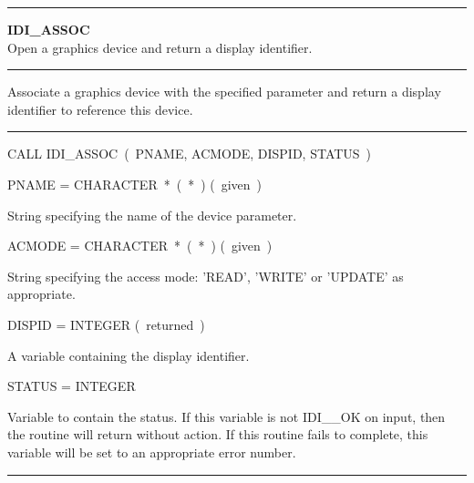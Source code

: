 \parbox{160mm}{

\rule{160mm}{0.5mm}

\hspace*{10mm}\parbox{140mm}{
{\bf IDI\_ASSOC} \\
Open a graphics device and return a display identifier.}

\rule{160mm}{0.1mm}

\hspace*{10mm}\parbox{140mm}{
Associate a graphics device with the specified parameter and return a
display identifier to reference this device.}

\rule{160mm}{0.1mm}

\hspace*{10mm}\parbox{140mm}{
CALL IDI\_ASSOC~(~PNAME, ACMODE, DISPID, STATUS~)}

\hspace*{10mm}\parbox{140mm}{
PNAME = CHARACTER~*~(~*~) \hspace{10mm} (~given~)}

\hspace*{30mm}\parbox{120mm}{
String specifying the name of the device parameter.}

\hspace*{10mm}\parbox{140mm}{
ACMODE = CHARACTER~*~(~*~) \hspace{10mm} (~given~)}

\hspace*{30mm}\parbox{120mm}{
String specifying the access mode: 'READ', 'WRITE' or 'UPDATE' as
appropriate.}

\hspace*{10mm}\parbox{140mm}{
DISPID = INTEGER \hspace{10mm} (~returned~)}

\hspace*{30mm}\parbox{120mm}{
A variable containing the display identifier.}

\hspace*{10mm}\parbox{140mm}{
STATUS = INTEGER}

\hspace*{30mm}\parbox{120mm}{
Variable to contain the status. If this variable is not IDI\_\_OK on input,
then the routine will return without action. If this routine fails to
complete, this variable will be set to an appropriate error number.}

\rule{160mm}{0.5mm}
}


